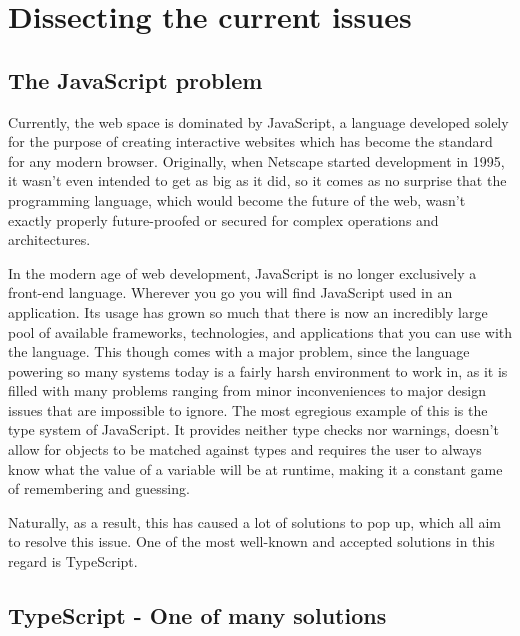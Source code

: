 \section{Dissecting the current issues}

\subsection{The JavaScript problem}

Currently, the web space is dominated by JavaScript, a language developed solely for the purpose of creating interactive websites which has become the standard for any modern browser. Originally, when Netscape started development in 1995, it wasn't even intended to get as big as it did, so it comes as no surprise that the programming language, which would become the future of the web, wasn't exactly properly future-proofed or secured for complex operations and architectures.

In the modern age of web development, JavaScript is no longer exclusively a front-end language. Wherever you go you will find JavaScript used in an application. Its usage has grown so much that there is now an incredibly large pool of available frameworks, technologies, and applications that you can use with the language. This though comes with a major problem, since the language powering so many systems today is a fairly harsh environment to work in, as it is filled with many problems ranging from minor inconveniences to major design issues that are impossible to ignore. The most egregious example of this is the type system of JavaScript. It provides neither type checks nor warnings, doesn't allow for objects to be matched against types and requires the user to always know what the value of a variable will be at runtime, making it a constant game of remembering and guessing.

Naturally, as a result, this has caused a lot of solutions to pop up, which all aim to resolve this issue. One of the most well-known and accepted solutions in this regard is TypeScript.

\subsection{TypeScript - One of many solutions}


